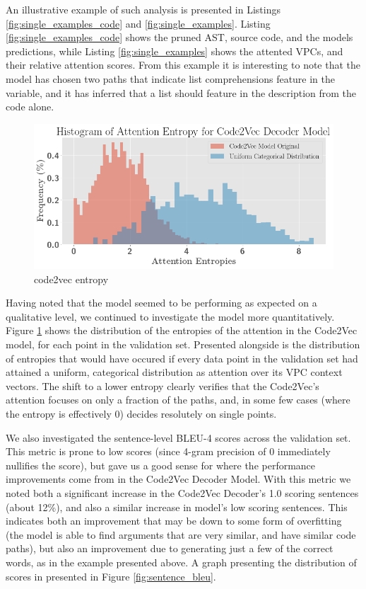 An illustrative example of such analysis is presented in Listings  \ref{fig:single_examples_code} and \ref{fig:single_examples}. 
Listing  \ref{fig:single_examples_code} shows the pruned AST, source code, and the models predictions, while Listing \ref{fig:single_examples} shows the attented VPCs, and their relative attention scores.
From this example it is interesting to note that the model has chosen two paths that indicate list comprehensions feature in the variable, and it has inferred that a list should feature in the description from the code alone.



\begin{figure}[h]
\begin{center}
\includegraphics[width=0.8\linewidth]{ImagesCodeRelated/code2vec_entropies.png}
\end{center}
\caption{code2vec entropy}
\label{fig:entropy_code2vec}
\end{figure}


Having noted that the model seemed to be performing as expected on a qualitative level, we continued to investigate the model more quantitatively. 
Figure \ref{fig:entropy_code2vec} shows the distribution of the entropies of the attention in the Code2Vec model, for each point in the validation set. 
Presented alongside is the distribution of entropies that would have occured if every data point in the validation set had attained a uniform, categorical distribution as attention over its VPC context vectors.
The shift to a lower entropy clearly verifies that the Code2Vec's attention focuses on only a fraction of the paths, and, in some few cases (where the entropy is effectively 0) decides resolutely on single points.

We also investigated the sentence-level BLEU-4 scores across the validation set. This metric is prone to low scores (since 4-gram precision of 0 immediately nullifies the score), but gave us a good sense for where the performance improvements come from in the Code2Vec Decoder Model.
With this metric we noted both a significant increase in the Code2Vec Decoder's 1.0 scoring sentences (about 12\%), and also a similar increase in model's low scoring sentences.
This indicates both an improvement that may be down to some form of overfitting (the model is able to find arguments that are very similar, and have similar code paths), but also an improvement due to generating just a few of the correct words, as in the example presented above. A graph presenting the distribution of scores in presented in Figure \ref{fig:sentence_bleu}.



